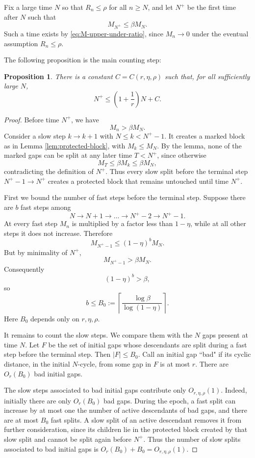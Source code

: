 \documentclass[11pt]{article}
\newtheorem{proposition}[theorem]{Proposition}
\theoremstyle{remark}
\begin{document}
\bigskip
\noindent
Fix a large time $N$ so that $R_n\leq\rho$ for all $n\geq N$, and let $N^+$ be the first time after $N$ such that
\[
    M_{N^+}\leq \beta M_N.
\]
Such a time exists by \eqref{eq:M-upper-under-ratio}, since $M_n\to0$ under the eventual assumption $R_n\leq\rho$.

\bigskip
\noindent
The following proposition is the main counting step:

\begin{proposition}\label{prop:epoch}
There is a constant $C=C(r,\eta,\rho)$ such that, for all sufficiently large $N$,
\[
    N^+\leq \left(1+\frac1r\right)N+C .
\]
\end{proposition}

\begin{proof}
Before time $N^+$, we have
\[
    M_n>\beta M_N .
\]
Consider a slow step $k\to k+1$ with $N\leq k<N^+-1$. It creates a marked block as in Lemma \ref{lem:protected-block}, with $M_k\leq M_N$. By the lemma, none of the marked gaps can be split at any later time $T<N^+$, since otherwise
\[
    M_T\leq \beta M_k\leq \beta M_N,
\]
contradicting the definition of $N^+$. Thus every slow split before the terminal step $N^+-1\to N^+$ creates a protected block that remains untouched until time $N^+$.

\bigskip
\noindent
First we bound the number of fast steps before the terminal step. Suppose there are $b$ fast steps among
\[
    N\to N+1\to\dots\to N^+-2\to N^+-1.
\]
At every fast step $M_n$ is multiplied by a factor less than $1-\eta$, while at all other steps it does not increase. Therefore
\[
    M_{N^+-1}\leq (1-\eta)^b M_N.
\]
But by minimality of $N^+$,
\[
    M_{N^+-1}>\beta M_N.
\]
Consequently
\[
    (1-\eta)^b>\beta,
\]
so
\[
    b\leq B_0:=\left\lceil\frac{\log \beta}{\log(1-\eta)}\right\rceil .
\]
Here $B_0$ depends only on $r,\eta,\rho$.

\bigskip
\noindent
It remains to count the slow steps. We compare them with the $N$ gaps present at time $N$. Let $F$ be the set of initial gaps whose descendants are split during a fast step before the terminal step. Then $|F|\leq B_0$. Call an initial gap ``bad" if its cyclic distance, in the initial $N$-cycle, from some gap in $F$ is at most $r$. There are $O_r(B_0)$ bad initial gaps.

\bigskip
\noindent
The slow steps associated to bad initial gaps contribute only $O_{r,\eta,\rho}(1)$. Indeed, initially there are only $O_r(B_0)$ bad gaps. During the epoch, a fast split can increase by at most one the number of active descendants of bad gaps, and there are at most $B_0$ fast splits. A slow split of an active descendant removes it from further consideration, since its children lie in the protected block created by that slow split and cannot be split again before $N^+$. Thus the number of slow splits associated to bad initial gaps is $O_r(B_0)+B_0=O_{r,\eta,\rho}(1)$.


\end{proof}
\end{document}
